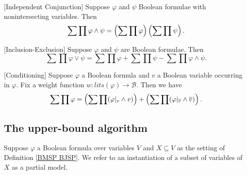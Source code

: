 \documentclass[acmsmall,review]{acmart}\settopmatter{printfolios=true,printccs=false,printacmref=false}
\begin{document}
\begin{lemma}\label{ind conj}[Independent Conjunction]
  Suppose $\varphi$ and $\psi$ Boolean formulae with nonintersecting variables. Then 
  \begin{equation}
    \sum\prod \varphi \land \psi = \left({\sum\prod \varphi}\right) \left({\sum\prod \psi}\right).
  \end{equation}
\end{lemma}

\begin{lemma}\label{disj}[Inclusion-Exclusion]
  Suppose $\varphi$ and $\psi$ are Boolean formulae. Then
  \begin{equation}
    \sum\prod\varphi \lor \psi = \sum\prod \varphi + \sum\prod \psi - \sum\prod \varphi\land\psi.
  \end{equation}
\end{lemma}

\begin{lemma}\label{conditioning}[Conditioning]
  Suppose $\varphi$ a Boolean formula and $v$ a Boolean variable occurring in $\varphi$. Fix a weight function $w : lits(\varphi) \to \mathcal B$. Then we have
  \begin{equation}
    \sum\prod \varphi = \left({\sum\prod (\varphi|_v \land v)}\right) + \left({\sum\prod (\varphi|_{\overline v} \land \overline v)}\right).
  \end{equation}
\end{lemma}

\subsection{The upper-bound algorithm}

Suppose $\varphi$ a Boolean formula over variables $V$ and $X \subseteq V$ as the setting of Definition \ref{BMSP BJSP}. We refer to an instantiation of a subset of variables of $X$ as a partial model.
\end{document}

